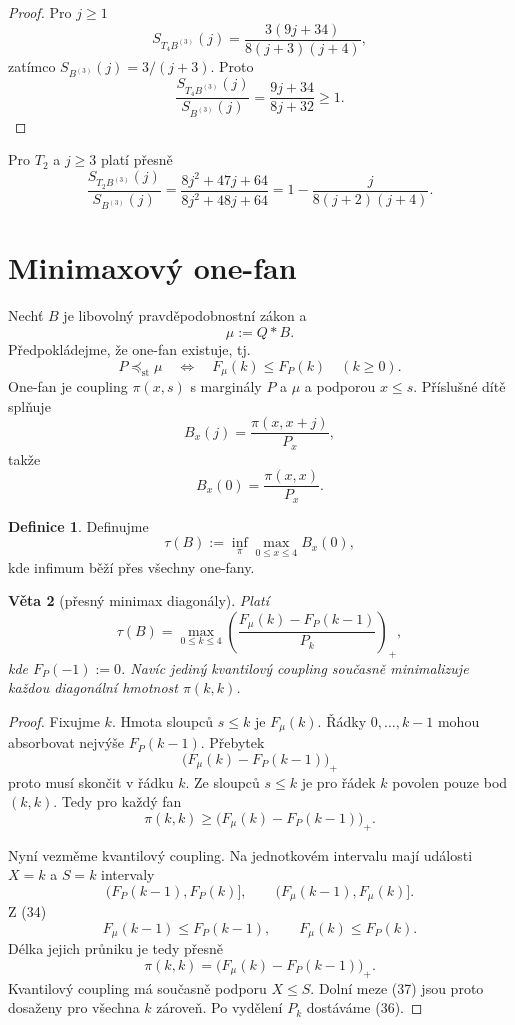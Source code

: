 \documentclass[11pt,a4paper]{article}
\newtheorem{theorem}{Věta}
\theoremstyle{definition}
\newtheorem{definition}[theorem]{Definice}
\theoremstyle{remark}
\theoremstyle{plain}
\newcommand{\st}{\mathrm{st}}
\begin{document}
\begin{proof}
Pro $j\ge1$
\[
S_{T_4B^{(3)}}(j)
=
\frac{3(9j+34)}{8(j+3)(j+4)},
\]
zatímco $S_{B^{(3)}}(j)=3/(j+3)$. Proto
\[
\frac{S_{T_4B^{(3)}}(j)}{S_{B^{(3)}}(j)}
=
\frac{9j+34}{8j+32}\ge1.
\]
\end{proof}

Pro $T_2$ a $j\ge3$ platí přesně
\[
\frac{S_{T_2B^{(3)}}(j)}{S_{B^{(3)}}(j)}
=
\frac{8j^2+47j+64}{8j^2+48j+64}
=
1-\frac{j}{8(j+2)(j+4)}.
\tag{33}
\]

\section{Minimaxový one-fan}

Nechť $B$ je libovolný pravděpodobnostní zákon a
\[
\mu:=Q*B.
\]
Předpokládejme, že one-fan existuje, tj.
\[
P\preceq_{\st}\mu
\quad\Longleftrightarrow\quad
F_\mu(k)\le F_P(k)\quad(k\ge0).
\tag{34}
\]
One-fan je coupling $\pi(x,s)$ s marginály $P$ a $\mu$ a podporou
$x\le s$. Příslušné dítě splňuje
\[
B_x(j)=\frac{\pi(x,x+j)}{P_x},
\]
takže
\[
B_x(0)=\frac{\pi(x,x)}{P_x}.
\]

\begin{definition}
Definujme
\[
\tau(B):=
\inf_\pi\max_{0\le x\le4}B_x(0),
\tag{35}
\]
kde infimum běží přes všechny one-fany.
\end{definition}

\begin{theorem}[přesný minimax diagonály]
Platí
\[
\boxed{
\tau(B)=
\max_{0\le k\le4}
\left(
\frac{F_\mu(k)-F_P(k-1)}{P_k}
\right)_+,
}
\tag{36}
\]
kde $F_P(-1):=0$.
Navíc jediný kvantilový coupling současně minimalizuje každou
diagonální hmotnost $\pi(k,k)$.
\end{theorem}

\begin{proof}
Fixujme $k$. Hmota sloupců $s\le k$ je $F_\mu(k)$. Řádky
$0,\dots,k-1$ mohou absorbovat nejvýše $F_P(k-1)$. Přebytek
\[
\bigl(F_\mu(k)-F_P(k-1)\bigr)_+
\]
proto musí skončit v řádku $k$. Ze sloupců $s\le k$ je pro řádek
$k$ povolen pouze bod $(k,k)$. Tedy pro každý fan
\[
\pi(k,k)\ge
\bigl(F_\mu(k)-F_P(k-1)\bigr)_+.
\tag{37}
\]

Nyní vezměme kvantilový coupling. Na jednotkovém intervalu mají
události $X=k$ a $S=k$ intervaly
\[
(F_P(k-1),F_P(k)],
\qquad
(F_\mu(k-1),F_\mu(k)].
\]
Z (34)
\[
F_\mu(k-1)\le F_P(k-1),
\qquad
F_\mu(k)\le F_P(k).
\]
Délka jejich průniku je tedy přesně
\[
\pi(k,k)
=
\bigl(F_\mu(k)-F_P(k-1)\bigr)_+.
\tag{38}
\]
Kvantilový coupling má současně podporu $X\le S$. Dolní meze (37)
jsou proto dosaženy pro všechna $k$ zároveň. Po vydělení $P_k$
dostáváme (36).
\end{proof}
\end{document}
